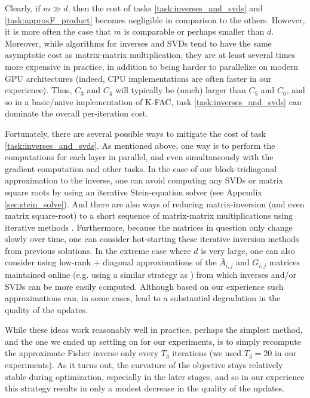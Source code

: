 \documentclass[12pt]{article}
\newcommand{\acronym}{K-FAC}
\begin{document}
Clearly, if $m \gg d$, then the cost of tasks \ref{task:inverses_and_svds} and \ref{task:approxF_product} becomes negligible in comparison to the others.  However, it is more often the case that $m$ is comparable or perhaps smaller than $d$.  Moreover, while algorithms for inverses and SVDs tend to have the same asymptotic cost as matrix-matrix multiplication, they are at least several times more expensive in practice, in addition to being harder to parallelize on modern GPU architectures (indeed, CPU implementations are often faster in our experience).   Thus, $C_3$ and $C_4$ will typically be (much) larger than $C_5$ and $C_6$, and so in a basic/naive implementation of \acronym{}, task \ref{task:inverses_and_svds} can dominate the overall per-iteration cost. 

Fortunately, there are several possible ways to mitigate the cost of task \ref{task:inverses_and_svds}.  As mentioned above, one way is to perform the computations for each layer in parallel, and even simultaneously with the gradient computation and other tasks.  In the case of our block-tridiagonal approximation to the inverse, one can avoid computing any SVDs or matrix square roots by using an iterative Stein-equation solver (see Appendix \ref{sec:stein_solve}).  And there are also ways of reducing matrix-inversion (and even matrix square-root) to a short sequence of matrix-matrix multiplications using iterative methods \citep{newton_inversion}.  Furthermore, because the matrices in question only change slowly over time, one can consider hot-starting these iterative inversion methods from previous solutions.  In the extreme case where $d$ is very large, one can also consider using low-rank + diagonal approximations of the $\bar{A}_{i,j}$ and $G_{i,j}$ matrices maintained online (e.g. using a similar strategy as \citet{TONGA}) from which inverses and/or SVDs can be more easily computed. Although based on our experience such approximations can, in some cases, lead to a substantial degradation in the quality of the updates.

While these ideas work reasonably well in practice, perhaps the simplest method, and the one we ended up settling on for our experiments, is to simply recompute the approximate Fisher inverse only every $T_3$ iterations (we used $T_3 = 20$ in our experiments).  As it turns out, the curvature of the objective stays relatively stable during optimization, especially in the later stages, and so in our experience this strategy results in only a modest decrease in the quality of the updates.
\end{document}
